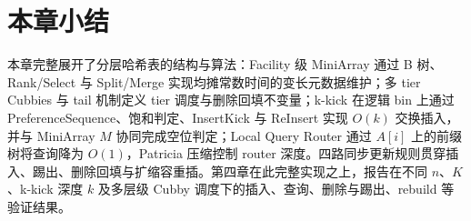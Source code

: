 \section{本章小结}

本章完整展开了分层哈希表的结构与算法：Facility 级 MiniArray 通过 B 树、Rank/Select 与 Split/Merge 实现均摊常数时间的变长元数据维护\cite{bayer1972,jacobson1989}；多 tier Cubbies 与 tail 机制定义 tier 调度与删除回填不变量\cite{bender2024iceberg,pandey2023iceberght}；k-kick 在逻辑 bin 上通过 PreferenceSequence、饱和判定、InsertKick 与 ReInsert 实现 \(O(k)\) 交换插入，并与 MiniArray \(M\) 协同完成空位判定\cite{bender2022otsh,pagh2004cuckoo}；Local Query Router 通过 \(A[i]\) 上的前缀树将查询降为 \(O(1)\)，Patricia 压缩控制 router 深度\cite{morrison1968,pagh2008retrieval}。四路同步更新规则贯穿插入、踢出、删除回填与扩缩容重插。第四章在此完整实现之上，报告在不同 \(n\)、\(K\)、k-kick 深度 \(k\) 及多层级 Cubby 调度下的插入、查询、删除与踢出、rebuild 等验证结果。
